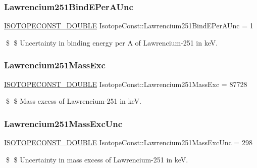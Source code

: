 \subsubsection{\texorpdfstring{Lawrencium251\+Bind\+E\+Per\+A\+Unc}{Lawrencium251BindEPerAUnc}}
{\footnotesize\ttfamily \mbox{\hyperlink{group___isotope_const-_macros_ga8f45a7272ce02c0b4c65c44636ed719a}{I\+S\+O\+T\+O\+P\+E\+C\+O\+N\+S\+T\+\_\+\+D\+O\+U\+B\+LE}} Isotope\+Const\+::\+Lawrencium251\+Bind\+E\+Per\+A\+Unc = 1}

\$ \$ Uncertainty in binding energy per A of Lawrencium-\/251 in keV. \mbox{\label{group___isotope_const-_lawrencium-_lr251_gadcb1f45a59e5a88f61ae731162090758}} 
\subsubsection{\texorpdfstring{Lawrencium251\+Mass\+Exc}{Lawrencium251MassExc}}
{\footnotesize\ttfamily \mbox{\hyperlink{group___isotope_const-_macros_ga8f45a7272ce02c0b4c65c44636ed719a}{I\+S\+O\+T\+O\+P\+E\+C\+O\+N\+S\+T\+\_\+\+D\+O\+U\+B\+LE}} Isotope\+Const\+::\+Lawrencium251\+Mass\+Exc = 87728}

\$ \$ Mass excess of Lawrencium-\/251 in keV. \mbox{\label{group___isotope_const-_lawrencium-_lr251_gadaac1d043dab15826d8ab28e43973da2}} 
\subsubsection{\texorpdfstring{Lawrencium251\+Mass\+Exc\+Unc}{Lawrencium251MassExcUnc}}
{\footnotesize\ttfamily \mbox{\hyperlink{group___isotope_const-_macros_ga8f45a7272ce02c0b4c65c44636ed719a}{I\+S\+O\+T\+O\+P\+E\+C\+O\+N\+S\+T\+\_\+\+D\+O\+U\+B\+LE}} Isotope\+Const\+::\+Lawrencium251\+Mass\+Exc\+Unc = 298}

\$ \$ Uncertainty in mass excess of Lawrencium-\/251 in keV. \mbox{\label{group___isotope_const-_lawrencium-_lr251_ga2a3aeb12b63ca9152b5fc6468ea9e70d}} 
